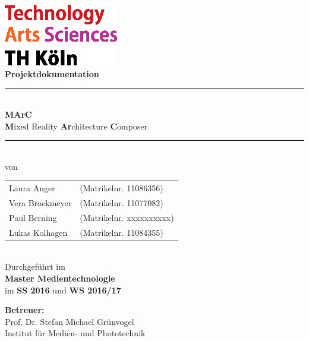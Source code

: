 \thispagestyle{empty}
\begin{center}
			\includegraphics[width=5cm]{Bilder/logo_TH}\\[12ex]
			{\Huge\textbf{Projektdokumentation}}\\[8ex]
			\rule{.8\textwidth}{.2pt}
			{\Large\\[1ex] \textbf{MArC}}\\
			{\textbf{M}ixed Reality \textbf{Ar}chitecture \textbf{C}omposer}\\
			\rule{.8\textwidth}{.2pt}\\[10ex]
			von\\[2ex]
			\begin{tabular}{ll}
			Laura Anger &(Matrikelnr. 11086356)\\ 
			Vera Brockmeyer &(Matrikelnr. 11077082)\\
			Paul Berning &(Matrikelnr. xxxxxxxxxx)\\
			Lukas Kolhagen &(Matrikelnr. 11084355)\\
			\end{tabular}\\[10ex]
			Durchgeführt im\\ \textbf{Master Medientechnologie}\\
			im \textbf{SS 2016} und \textbf{WS 2016/17}\\			
			\end{center}
			\vfill
			\begin{flushleft}
			{\bf Betreuer:}\\
			Prof. Dr. Stefan Michael Grünvogel\\
			Institut für Medien- und Phototechnik
			\end{flushleft}
	\newpage